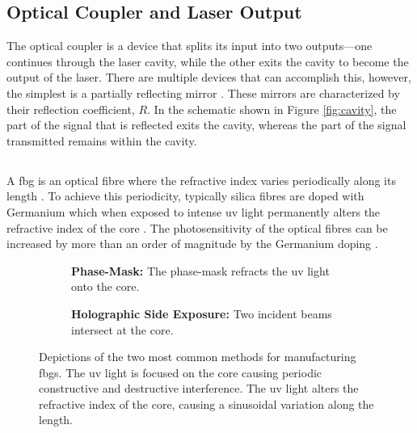 \subsection{Optical Coupler and Laser Output}
The optical coupler is a device that splits its input into two outputs---one continues through the laser cavity, while the other exits the cavity to become the output of the laser. There are multiple devices that can accomplish this, however, the simplest is a partially reflecting mirror \cite{alazzawi}. These mirrors are characterized by their reflection coefficient, $R$. In the schematic shown in Figure \ref{fig:cavity}, the part of the signal that is reflected exits the cavity, whereas the part of the signal transmitted remains within the cavity. \\

\subsection{}
\label{sec:fbg}
A \gls{fbg} is an optical fibre where the refractive index varies periodically along its length \cite{ferreira}. To achieve this periodicity, typically silica fibres are doped with Germanium which when exposed to intense \gls{uv} light permanently alters the refractive index of the core \cite{becker, starodoumov}. The photosensitivity of the optical fibres can be increased by more than an order of magnitude by the Germanium doping \cite{becker, ferreira}. \\

\begin{figure}[p]
\centering
\begin{subfigure}{\textwidth}
\centering

\caption{\textbf{Phase-Mask:} The phase-mask refracts the \gls{uv} light onto the core.}
\label{fig:phasemask}
\vspace{10mm}
\end{subfigure}
\begin{subfigure}{\textwidth}
\centering

\caption{\textbf{Holographic Side Exposure:} Two incident beams intersect at the core.}
\label{fig:holographic}
\end{subfigure}
\caption[Manufacture methods of fibre Bragg gratings.]{Depictions of the two most common methods for manufacturing \gls{fbg}s. The \gls{uv} light is focused on the core causing periodic constructive and destructive interference. The \gls{uv} light alters the refractive index of the core, causing a sinusoidal variation along the length.}
\label{fig:fbgmake}
\end{figure}

